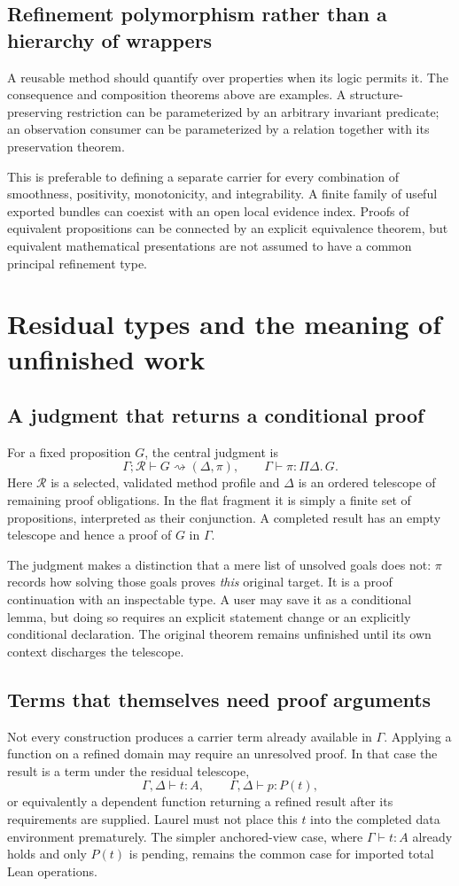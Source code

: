 \documentclass[11pt,a4paper]{article}
\theoremstyle{definition}
\theoremstyle{remark}
\begin{document}
\subsection{Refinement polymorphism rather than a hierarchy of wrappers}
A reusable method should quantify over properties when its logic permits it. The consequence and composition theorems above are examples. A structure-preserving restriction can be parameterized by an arbitrary invariant predicate; an observation consumer can be parameterized by a relation together with its preservation theorem.

This is preferable to defining a separate carrier for every combination of smoothness, positivity, monotonicity, and integrability. A finite family of useful exported bundles can coexist with an open local evidence index. Proofs of equivalent propositions can be connected by an explicit equivalence theorem, but equivalent mathematical presentations are not assumed to have a common principal refinement type.

\section{Residual types and the meaning of unfinished work}\label{sec:residualtypes}
\subsection{A judgment that returns a conditional proof}
For a fixed proposition $G$, the central judgment is
\[
 \Gamma;\mathcal R\vdash G\rightsquigarrow(\Delta,\pi),
 \qquad \Gamma\vdash\pi:\Pi\Delta.\,G.
\]
Here $\mathcal R$ is a selected, validated method profile and $\Delta$ is an ordered telescope of remaining proof obligations. In the flat fragment it is simply a finite set of propositions, interpreted as their conjunction. A completed result has an empty telescope and hence a proof of $G$ in $\Gamma$.

The judgment makes a distinction that a mere list of unsolved goals does not: $\pi$ records how solving those goals proves \emph{this} original target. It is a proof continuation with an inspectable type. A user may save it as a conditional lemma, but doing so requires an explicit statement change or an explicitly conditional declaration. The original theorem remains unfinished until its own context discharges the telescope.

\subsection{Terms that themselves need proof arguments}
Not every construction produces a carrier term already available in $\Gamma$. Applying a function on a refined domain may require an unresolved proof. In that case the result is a term under the residual telescope,
\[
 \Gamma,\Delta\vdash t:A,\qquad
 \Gamma,\Delta\vdash p:P(t),
\]
or equivalently a dependent function returning a refined result after its requirements are supplied. Laurel must not place this $t$ into the completed data environment prematurely. The simpler anchored-view case, where $\Gamma\vdash t:A$ already holds and only $P(t)$ is pending, remains the common case for imported total Lean operations.
\end{document}

